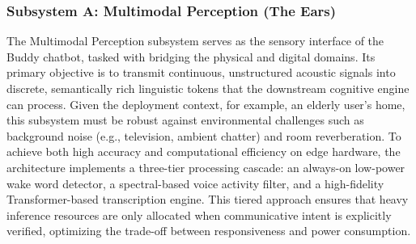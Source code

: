 \subsubsection{Subsystem A: Multimodal Perception (The Ears)}
The Multimodal Perception subsystem serves as the sensory interface of the Buddy chatbot, tasked with bridging the physical and digital domains. Its primary objective is to transmit continuous, unstructured acoustic signals into discrete, semantically rich linguistic tokens that the downstream cognitive engine can process. Given the deployment context, for example, an elderly user's home, this subsystem must be robust against environmental challenges such as background noise (e.g., television, ambient chatter) and room reverberation. To achieve both high accuracy and computational efficiency on edge hardware, the architecture implements a three-tier processing cascade: an always-on low-power wake word detector, a spectral-based voice activity filter, and a high-fidelity Transformer-based transcription engine. This tiered approach ensures that heavy inference resources are only allocated when communicative intent is explicitly verified, optimizing the trade-off between responsiveness and power consumption.
